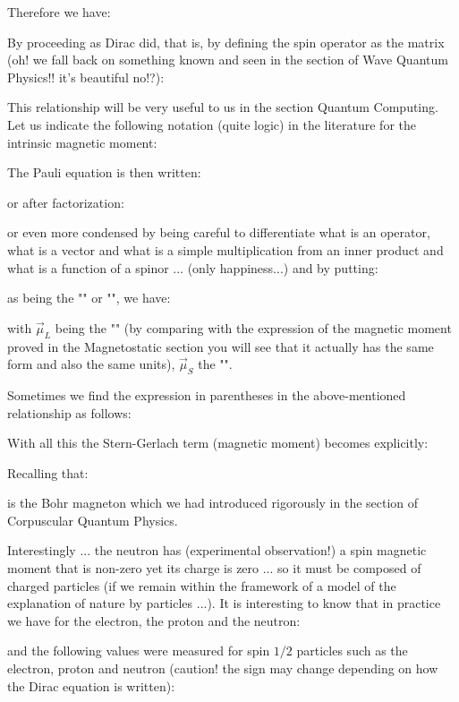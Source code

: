 	Therefore we have:
	
	By proceeding as Dirac did, that is, by defining the spin operator as the matrix (oh! we fall back on something known and seen in the section of Wave Quantum Physics!! it's beautiful no!?):
	
	This relationship will be very useful to us in the section Quantum Computing. Let us indicate the following notation (quite logic) in the literature for the intrinsic magnetic moment:
	
	The Pauli equation is then written:
	
	or after factorization:
	
	or even more condensed by being careful to differentiate what is an operator, what is a vector and what is a simple multiplication from an inner product and what is a function of a spinor ... (only happiness...) and by putting:
	
	as being the "" or "", we have:
	
	with $\vec{\mu}_L$ being the "" (by comparing with the expression of the magnetic moment proved in the Magnetostatic section you will see that it actually has the same form and also the same units), $\vec{\mu}_S$ the "".

	Sometimes we find the expression in parentheses in the above-mentioned relationship as follows:
	
	With all this the Stern-Gerlach term (magnetic moment) becomes explicitly:
	
	Recalling that:
	
	is the Bohr magneton which we had introduced rigorously in the section of Corpuscular Quantum Physics.
	
	Interestingly ... the neutron has (experimental observation!) a spin magnetic moment that is non-zero yet its charge is zero ... so it must be composed of charged particles (if we remain within the framework of a model of the explanation of nature by particles ...). It is interesting to know that in practice we have for the electron, the proton and the neutron:
	
	and the following values were measured for spin $1/2$ particles such as the electron, proton and neutron (caution! the sign may change depending on how the Dirac equation is written):
	
